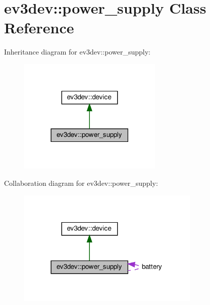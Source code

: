 \hypertarget{classev3dev_1_1power__supply}{}\section{ev3dev\+:\+:power\+\_\+supply Class Reference}
\label{classev3dev_1_1power__supply}


Inheritance diagram for ev3dev\+:\+:power\+\_\+supply\+:
\nopagebreak
\begin{figure}[H]
\begin{center}
\leavevmode
\includegraphics[width=194pt]{classev3dev_1_1power__supply__inherit__graph}
\end{center}
\end{figure}


Collaboration diagram for ev3dev\+:\+:power\+\_\+supply\+:
\nopagebreak
\begin{figure}[H]
\begin{center}
\leavevmode
\includegraphics[width=246pt]{classev3dev_1_1power__supply__coll__graph}
\end{center}
\end{figure}
